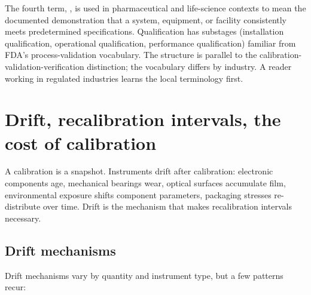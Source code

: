 \begin{mastery}
The fourth term, , is used in
pharmaceutical and life-science contexts to mean the documented
demonstration that a system, equipment, or facility consistently
meets predetermined specifications. Qualification has substages
(installation qualification, operational qualification, performance
qualification) familiar from FDA's process-validation vocabulary.
The structure is parallel to the calibration-validation-verification
distinction; the vocabulary differs by industry. A reader working in
regulated industries learns the local terminology first.
\end{mastery}

\section{Drift, recalibration intervals, the cost of
calibration}

A calibration is a snapshot. Instruments drift after calibration:
electronic components age, mechanical bearings wear, optical
surfaces accumulate film, environmental exposure shifts component
parameters, packaging stresses re-distribute over time. Drift is the
mechanism that makes recalibration intervals necessary.

\subsection{Drift mechanisms}

Drift mechanisms vary by quantity and instrument type, but a few
patterns recur:

